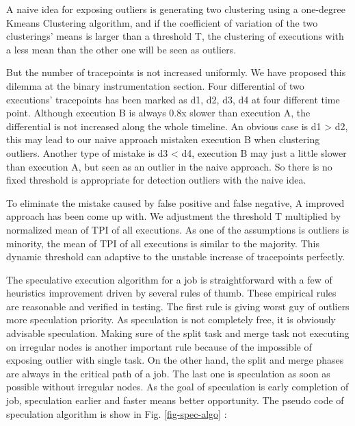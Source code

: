 A naive idea for exposing outliers is generating two clustering using a one-degree Kmeans Clustering algorithm, and if the coefficient of variation of the two clusterings’ means is larger than a threshold T, the clustering of executions with a less mean than the other one  will be seen as outliers.

But the number of tracepoints is not increased uniformly. We have proposed this dilemma at the binary instrumentation section. Four differential of two executions’ tracepoints has been marked as d1, d2, d3, d4 at four different time point. Although execution B is always 0.8x slower than execution A, the differential is not increased along the whole timeline. An obvious case is d1 > d2, this may lead to our naive approach mistaken execution B when clustering outliers. Another type of mistake is d3 < d4, execution B may just a little slower than execution A, but seen as an outlier in the naive approach. So there is no fixed threshold is appropriate for detection outliers with the naive idea.

To eliminate  the mistake caused by false positive and false negative, A improved approach has been come up with. We adjustment the threshold T multiplied by normalized mean of TPI of all executions. As one of the assumptions is outliers is minority, the mean of TPI of all executions is similar to the majority. This dynamic threshold can adaptive to the unstable increase of tracepoints perfectly.

The speculative execution algorithm for a job is straightforward with a few of heuristics improvement driven by several rules of thumb. These empirical rules are reasonable and verified in testing. The first rule is giving worst guy of outliers more speculation priority. As speculation is not completely free, it is obviously advisable speculation. Making sure of the split task and merge task not executing on irregular nodes is another important rule because of the impossible of exposing outlier with single task. On the other hand, the split and merge phases are always in the critical path of a job. The last one is speculation as soon as possible without irregular nodes. As the goal of speculation is early completion of job, speculation earlier and faster means better opportunity. The pseudo code of speculation algorithm is show in Fig. \ref{fig-spec-algo} :

